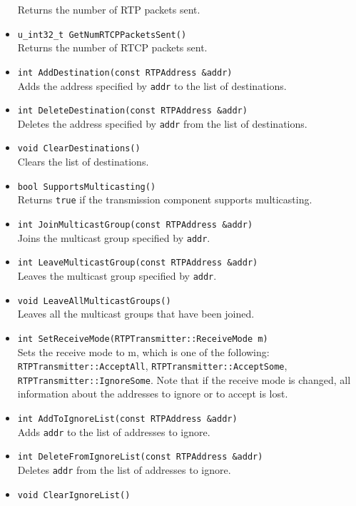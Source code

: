 \documentclass[12pt,a4paper]{article}
\begin{document}
\begin{itemize}
						Returns the number of RTP packets sent.
					\item {\tt u\_int32\_t GetNumRTCPPacketsSent()}\\
						Returns the number of RTCP packets sent.
					\item {\tt int AddDestination(const RTPAddress \&addr)}\\
						Adds the address specified by {\tt addr} to the list of
						destinations.
					\item {\tt int DeleteDestination(const RTPAddress \&addr)}\\
						Deletes the address specified by {\tt addr} from the list
						of destinations.
					\item {\tt void ClearDestinations()}\\
						Clears the list of destinations.
					\item {\tt bool SupportsMulticasting()}\\
						Returns {\tt true} if the transmission component supports
						multicasting.
					\item {\tt int JoinMulticastGroup(const RTPAddress \&addr)}\\
						Joins the multicast group specified by {\tt addr}.
					\item {\tt int LeaveMulticastGroup(const RTPAddress \&addr)}\\
						Leaves the multicast group specified by {\tt addr}.
					\item {\tt void LeaveAllMulticastGroups()}\\
						Leaves all the multicast groups that have been joined.
					\item {\tt int SetReceiveMode(RTPTransmitter::ReceiveMode m)}\\
						Sets the receive mode to m, which is one of the following:
						{\tt RTPTrans\-mitter::\-Accept\-All}, {\tt RTPTrans\-mitter::\-Accept\-Some},
						{\tt RTPTrans\-mitter::\-Ignore\-Some}. Note that if the receive
						mode is changed, all information about the addresses to ignore
						or to accept is lost.
					\item {\tt int AddToIgnoreList(const RTPAddress \&addr)}\\
						Adds {\tt addr} to the list of addresses to ignore.
					\item {\tt int DeleteFromIgnoreList(const RTPAddress \&addr)}\\
						Deletes {\tt addr} from the list of addresses to ignore.
					\item {\tt void ClearIgnoreList()}\\

\end{itemize}
\end{document}
